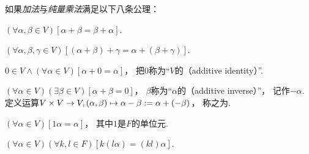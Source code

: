 \begin{definition}
如果\emph{加法}与\emph{纯量乘法}满足以下八条公理：
\begin{center}
	\begin{minipage}{.8\textwidth}
		\begin{axiom}\label{definition:线性空间.运算法则1}
		\((\forall\alpha,\beta\in V)
		[\alpha+\beta=\beta+\alpha]\).
		\end{axiom}
		\begin{axiom}\label{definition:线性空间.运算法则2}
		\((\forall\alpha,\beta,\gamma\in V)
		[(\alpha+\beta)+\gamma=\alpha+(\beta+\gamma)]\).
		\end{axiom}
		\begin{axiom}\label{definition:线性空间.运算法则3}
		\(0\in V
		\land
		(\forall\alpha \in V)
		[\alpha+0=\alpha]\)，
		把\(0\)称为“\(V\)的（additive identity）”.
		\end{axiom}
		\begin{axiom}\label{definition:线性空间.运算法则4}
		\((\forall\alpha \in V)
		(\exists\beta \in V)
		[\alpha+\beta=0]\)，
		\(\beta\)称为“\(\alpha\)的（additive inverse）”，
		记作\(-\alpha\).
		定义运算\(V\times V \to V,(\alpha,\beta) \mapsto \alpha-\beta := \alpha+(-\beta)\)，
		称之为.
		\end{axiom}
		\begin{axiom}\label{definition:线性空间.运算法则5}
		\((\forall\alpha\in V)[1\alpha=\alpha]\)，
		其中\(1\)是\(F\)的单位元.
		\end{axiom}
		\begin{axiom}\label{definition:线性空间.运算法则6}
		\((\forall\alpha\in V)
		(\forall k,l\in F)
		[k(l\alpha)=(kl)\alpha]\).
		\end{axiom}
		\begin{axiom}\label{definition:线性空间.运算法则7}

\end{axiom}
\end{minipage}
\end{center}
\end{definition}
